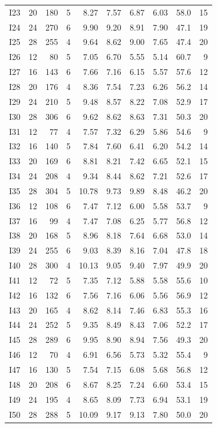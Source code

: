 \begin{table}[htbp]
\begin{tabular}{lrrrrrrrrr}
I23 & 20 & 180 & 5 & 8.27 & 7.57 & 6.87 & 6.03 & 58.0 & 15 \\
I24 & 24 & 270 & 6 & 9.90 & 9.20 & 8.91 & 7.90 & 47.1 & 19 \\
I25 & 28 & 255 & 4 & 9.64 & 8.62 & 9.00 & 7.65 & 47.4 & 20 \\
I26 & 12 & 80 & 5 & 7.05 & 6.70 & 5.55 & 5.14 & 60.7 & 9 \\
I27 & 16 & 143 & 6 & 7.66 & 7.16 & 6.15 & 5.57 & 57.6 & 12 \\
I28 & 20 & 176 & 4 & 8.36 & 7.54 & 7.23 & 6.26 & 56.2 & 14 \\
I29 & 24 & 210 & 5 & 9.48 & 8.57 & 8.22 & 7.08 & 52.9 & 17 \\
I30 & 28 & 306 & 6 & 9.62 & 8.62 & 8.63 & 7.31 & 50.3 & 20 \\
I31 & 12 & 77 & 4 & 7.57 & 7.32 & 6.29 & 5.86 & 54.6 & 9 \\
I32 & 16 & 140 & 5 & 7.84 & 7.60 & 6.41 & 6.20 & 54.2 & 14 \\
I33 & 20 & 169 & 6 & 8.81 & 8.21 & 7.42 & 6.65 & 52.1 & 15 \\
I34 & 24 & 208 & 4 & 9.34 & 8.44 & 8.62 & 7.21 & 52.6 & 17 \\
I35 & 28 & 304 & 5 & 10.78 & 9.73 & 9.89 & 8.48 & 46.2 & 20 \\
I36 & 12 & 108 & 6 & 7.47 & 7.12 & 6.00 & 5.58 & 53.7 & 9 \\
I37 & 16 & 99 & 4 & 7.47 & 7.08 & 6.25 & 5.77 & 56.8 & 12 \\
I38 & 20 & 168 & 5 & 8.96 & 8.18 & 7.64 & 6.68 & 53.0 & 14 \\
I39 & 24 & 255 & 6 & 9.03 & 8.39 & 8.16 & 7.04 & 47.8 & 18 \\
I40 & 28 & 300 & 4 & 10.13 & 9.05 & 9.40 & 7.97 & 49.9 & 20 \\
I41 & 12 & 72 & 5 & 7.35 & 7.12 & 5.88 & 5.58 & 55.6 & 10 \\
I42 & 16 & 132 & 6 & 7.56 & 7.16 & 6.06 & 5.56 & 56.9 & 12 \\
I43 & 20 & 165 & 4 & 8.62 & 8.14 & 7.46 & 6.83 & 55.3 & 16 \\
I44 & 24 & 252 & 5 & 9.35 & 8.49 & 8.43 & 7.06 & 52.2 & 17 \\
I45 & 28 & 289 & 6 & 9.95 & 8.90 & 8.94 & 7.56 & 49.3 & 20 \\
I46 & 12 & 70 & 4 & 6.91 & 6.56 & 5.73 & 5.32 & 55.4 & 9 \\
I47 & 16 & 130 & 5 & 7.54 & 7.15 & 6.08 & 5.68 & 56.8 & 12 \\
I48 & 20 & 208 & 6 & 8.67 & 8.25 & 7.24 & 6.60 & 53.4 & 15 \\
I49 & 24 & 195 & 4 & 8.65 & 8.09 & 7.73 & 6.94 & 53.1 & 19 \\
I50 & 28 & 288 & 5 & 10.09 & 9.17 & 9.13 & 7.80 & 50.0 & 20 \\
\bottomrule
\end{tabular}
\end{table}
